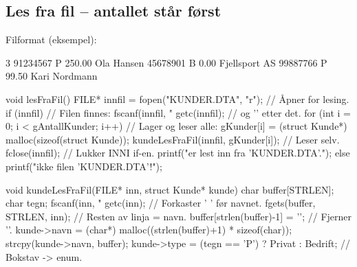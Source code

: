 \subsection{Les fra fil -- antallet står først}\label{sec:lesfil}
Filformat (eksempel):
\begin{kode}[language={},backgroundcolor=\color{white}]
3
91234567 P 250.00 Ola Hansen
45678901 B 0.00 Fjellsport AS
99887766 P 99.50 Kari Nordmann
\end{kode}
\begin{kode}
void lesFraFil()  {
  FILE* innfil = fopen("KUNDER.DTA", "r");             //  Åpner for lesing.
  if (innfil)  {                                       //  Filen finnes:
     fscanf(innfil, "%
     getc(innfil);                                     //    og '\n' etter det.
     for (int i = 0;  i < gAntallKunder;  i++)  {      //  Lager og leser alle:
         gKunder[i] = (struct Kunde*) malloc(sizeof(struct Kunde));
         kundeLesFraFil(innfil, gKunder[i]);           //  Leser selv.
     }
     fclose(innfil);                                   //  Lukker INNI if-en.
     printf("\n\tKundene er lest inn fra 'KUNDER.DTA'.\n");
  } else
     printf("\n\tFant ikke filen 'KUNDER.DTA'!\n");
}

void kundeLesFraFil(FILE* inn, struct Kunde* kunde)  {
  char buffer[STRLEN];
  char tegn;
  fscanf(inn, "%
  getc(inn);                                           //  Forkaster ' ' før navnet.
  fgets(buffer, STRLEN, inn);                          //  Resten av linja = navn.
  buffer[strlen(buffer)-1] = '\0';                     //  Fjerner '\n'.
  kunde->navn = (char*) malloc((strlen(buffer)+1) * sizeof(char));
  strcpy(kunde->navn, buffer);
  kunde->type = (tegn == 'P') ? Privat : Bedrift;      //  Bokstav -> enum.
}
\end{kode}

